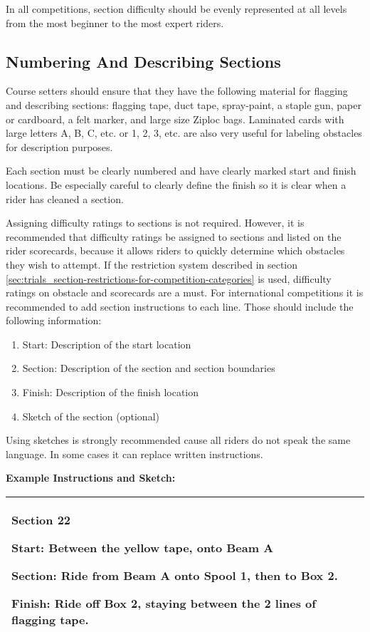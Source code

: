 In all competitions, section difficulty should be evenly represented at all levels from the most beginner to the most expert riders. 

\subsection{Numbering And Describing Sections \label{sec:trials_guidelines-for-course-setters}}
Course setters should ensure that they have the following material for flagging and describing sections: flagging tape, duct tape, spray-paint, a staple gun, paper or cardboard, a felt marker, and large size Ziploc bags. 
Laminated cards with large letters A, B, C, etc. or 1, 2, 3, etc. are also very useful for labeling obstacles for description purposes.

Each section must be clearly numbered and have clearly marked start and finish locations. 
Be especially careful to clearly define the finish so it is clear when a rider has cleaned a section.

Assigning difficulty ratings to sections is not required. 
However, it is recommended that difficulty ratings be assigned to sections and listed on the rider scorecards, because it allows riders to quickly determine which obstacles they wish to attempt. 
If the restriction system described in section \ref{sec:trials_section-restrictions-for-competition-categories} is used, difficulty ratings on obstacle and scorecards are a must. 
For international competitions it is recommended to add section instructions to each line. 
Those should include the following information:

\begin{enumerate}
\item  Start: Description of the start location
\item Section: Description of the section and section boundaries
\item Finish: Description of the finish location
\item Sketch of the section (optional)
\end{enumerate}
Using sketches is strongly recommended cause all riders do not speak the same language. 
In some cases it can replace written instructions.

\textbf{Example Instructions and Sketch:}

\begin{tabular}{|p{8cm} r|}
\hline
\vspace{1mm}
\textbf{Section 22}

\textbf{Start:} Between the yellow tape, onto Beam A

\textbf{Section:} Ride from Beam A onto Spool 1, then to Box 2.

\textbf{Finish:} Ride off Box 2, staying between the 2 lines of flagging tape.
\vspace{8mm}
&
\raisebox{-1\height}{\texttt{[image: trials]} }\\
\hline
\end{tabular}

